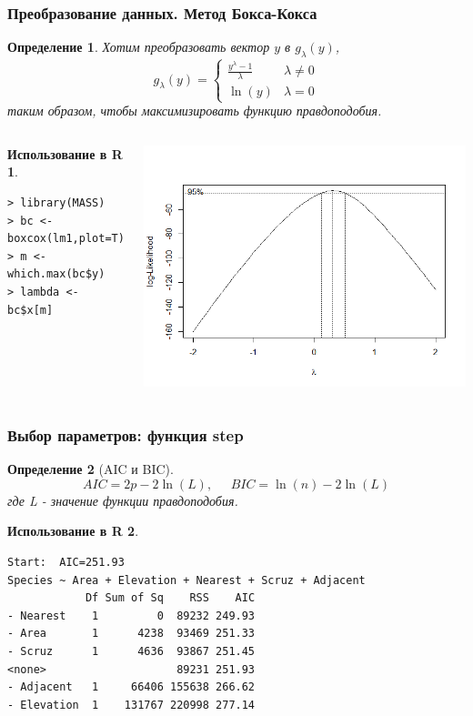 \documentclass{beamer}
\newtheorem{defn}{Определение}
\newtheorem{exmpr}{Использование в R}
\begin{document}
\begin{frame}[containsverbatim]
\frametitle{Преобразование данных. Метод Бокса-Кокса}
\begin{defn}
Хотим преобразовать вектор $y$ в $g_{\lambda}(y)$,
$$g_{\lambda}(y)=\begin{cases}
 \frac{y^{\lambda}-1}{\lambda} & \lambda \ne 0 \\
 \ln(y) & \lambda = 0
 \end{cases}$$
таким образом, чтобы максимизировать функцию правдоподобия.
\end{defn}
\begin{columns}
\begin{exmpr}
\begin{verbatim}
> library(MASS)
> bc <- boxcox(lm1,plot=T)
> m <- which.max(bc$y)
> lambda <- bc$x[m]
\end{verbatim}
\end{exmpr}
\begin{center}
\includegraphics[width=1\textwidth,height=0.4\textheight]{boxcox.png}
\end{center}
\end{columns}
\end{frame}


\begin{frame}[containsverbatim]
\frametitle{Выбор параметров: функция step}
\begin{defn}[AIC и BIC]
$$AIC=2p-2\ln(L),\;\;\;\;\;BIC=\ln(n)-2\ln(L)$$
где L - значение функции правдоподобия.
\end{defn}
\begin{exmpr}
\begin{verbatim}
Start:  AIC=251.93
Species ~ Area + Elevation + Nearest + Scruz + Adjacent
            Df Sum of Sq    RSS    AIC
- Nearest    1         0  89232 249.93
- Area       1      4238  93469 251.33
- Scruz      1      4636  93867 251.45
<none>                    89231 251.93
- Adjacent   1     66406 155638 266.62
- Elevation  1    131767 220998 277.14
\end{verbatim}
\end{exmpr}

\end{frame}
\end{document}
